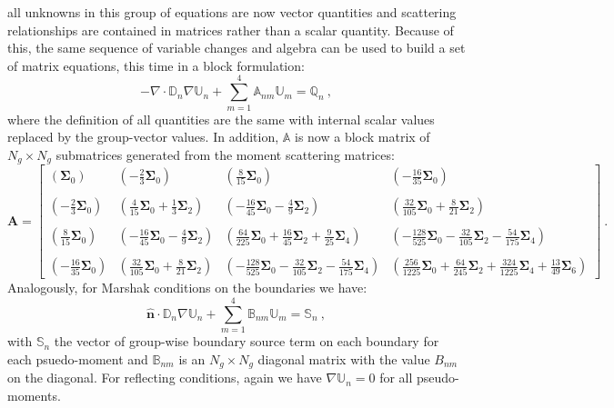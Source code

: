 all unknowns in this group of equations are now vector quantities and
scattering relationships are contained in matrices rather than a
scalar quantity. Because of this, the same sequence of variable
changes and algebra can be used to build a set of matrix equations,
this time in a block formulation:
\begin{equation}
  -\nabla \cdot \mathbb{D}_n \nabla \mathbb{U}_n + \sum_{m=1}^4
  \mathbb{A}_{nm} \mathbb{U}_m = \mathbb{Q}_n\:,
  \label{eq:spn_multigroup_system}
\end{equation}
where the definition of all quantities are the same with internal
scalar values replaced by the group-vector values. In addition,
$\mathbb{A}$ is now a block matrix of $N_g \times N_g$ submatrices
generated from the moment scattering matrices:
\begin{equation}
  \mathbf{A} = 
  \begin{bmatrix}
    (\mathbf{\Sigma}_0) &
    (-\frac{2}{3}\mathbf{\Sigma}_0) &
    (\frac{8}{15}\mathbf{\Sigma}_0) &
    (-\frac{16}{35}\mathbf{\Sigma}_0) \\
    &&&\\
    (-\frac{2}{3}\mathbf{\Sigma}_0) &
    (\frac{4}{15}\mathbf{\Sigma}_0 + \frac{1}{3}\mathbf{\Sigma}_2) &
    (-\frac{16}{45}\mathbf{\Sigma}_0 - \frac{4}{9}\mathbf{\Sigma}_2) &
    (\frac{32}{105}\mathbf{\Sigma}_0 + \frac{8}{21}\mathbf{\Sigma}_2) \\
    &&&\\
    (\frac{8}{15}\mathbf{\Sigma}_0) &
    (-\frac{16}{45}\mathbf{\Sigma}_0 - \frac{4}{9}\mathbf{\Sigma}_2) &
    (\frac{64}{225}\mathbf{\Sigma}_0 + \frac{16}{45}\mathbf{\Sigma}_2 + \frac{9}{25}\mathbf{\Sigma}_4) &
    (-\frac{128}{525}\mathbf{\Sigma}_0 - \frac{32}{105}\mathbf{\Sigma}_2 - \frac{54}{175}\mathbf{\Sigma}_4)
    \\ 
    &&&\\
    (-\frac{16}{35}\mathbf{\Sigma}_0) &
    (\frac{32}{105}\mathbf{\Sigma}_0 + \frac{8}{21}\mathbf{\Sigma}_2) &
    (-\frac{128}{525}\mathbf{\Sigma}_0 - \frac{32}{105}\mathbf{\Sigma}_2 - \frac{54}{175}\mathbf{\Sigma}_4)
    & 
    (\frac{256}{1225}\mathbf{\Sigma}_0 + \frac{64}{245}\mathbf{\Sigma}_2 +
    \frac{324}{1225}\mathbf{\Sigma}_4 + \frac{13}{49}\mathbf{\Sigma}_6)
  \end{bmatrix}\:.
  \label{eq:A_block_matrix}
\end{equation}
Analogously, for Marshak conditions on the boundaries we have:
\begin{equation}
  \hat{\mathbf{n}} \cdot \mathbb{D}_n \nabla \mathbb{U}_n +
  \sum_{m=1}^4 \mathbb{B}_{nm} \mathbb{U}_m = \mathbb{S}_n\:,
  \label{eq:spn_multigroup_bnd}
\end{equation}
with $\mathbb{S}_n$ the vector of group-wise boundary source term on
each boundary for each psuedo-moment and $\mathbb{B}_{nm}$ is an $N_g
\times N_g$ diagonal matrix with the value $B_{nm}$ on the
diagonal. For reflecting conditions, again we have $\nabla
\mathbb{U}_n = 0$ for all pseudo-moments.

